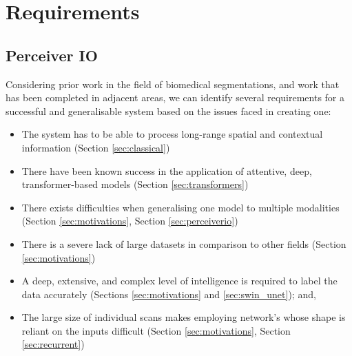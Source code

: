 \documentclass{l4proj}
\begin{document}
\chapter{Requirements} \label{chap:requirements}




    \section{Perceiver IO}

Considering prior work in the field of biomedical segmentations, and work that has been completed in adjacent areas, we can identify several requirements for a successful and generalisable system based on the issues faced in creating one:

\begin{itemize}
  \item{The system has to be able to process long-range spatial and contextual information (Section \ref{sec:classical})}
  \item{There have been known success in the application of attentive, deep, transformer-based models (Section \ref{sec:transformers})}
  \item{There exists difficulties when generalising one model to multiple modalities (Section \ref{sec:motivations}, Section \ref{sec:perceiverio})}
  \item{There is a severe lack of large datasets in comparison to other fields (Section \ref{sec:motivations})}
  \item{A deep, extensive, and complex level of intelligence is required to label the data accurately (Sections \ref{sec:motivations} and \ref{sec:swin_unet}); and,}
  \item{The large size of individual scans makes employing network’s whose shape is reliant on the inputs difficult (Section \ref{sec:motivations}, Section \ref{sec:recurrent})}
\end{itemize}
\end{document}
